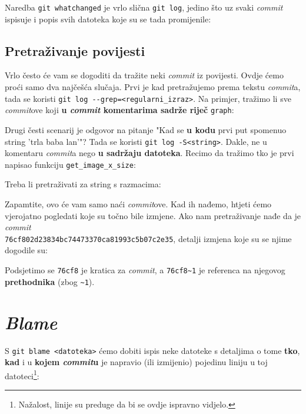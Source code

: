 Naredba \verb+git whatchanged+ je vrlo slična \verb+git log+, jedino što uz svaki \emph{commit} ispisuje i popis svih datoteka koje su se tada promijenile:



\subsection*{Pretraživanje povijesti}

Vrlo često će vam se dogoditi da tražite neki \emph{commit} iz povijesti.
Ovdje ćemo proći samo dva najčešća slučaja.
Prvi je kad pretražujemo prema tekstu \emph{commit}a, tada se koristi \verb+git log --grep=<regularni_izraz>+.
Na primjer, tražimo li sve \emph{commit}ove koji \textbf{u \emph{commit} komentarima sadrže riječ} \verb+graph+:


Drugi česti scenarij je odgovor na pitanje "Kad se \textbf{u kodu} prvi put spomenuo string 'trla baba lan'"? Tada se koristi \verb+git log -S<string>+.
Dakle, ne u komentaru \emph{commit}a nego \textbf{u sadržaju datoteka}.
Recimo da tražimo tko je prvi napisao funkciju \verb+get_image_x_size+:


Treba li pretraživati za string s razmacima:


Zapamtite, ovo će vam samo naći \emph{commit}ove.
Kad ih nađemo, htjeti ćemo vjerojatno pogledati koje su točno bile izmjene.
Ako nam pretraživanje nađe da je \emph{commit} \\ \verb+76cf802d23834bc74473370ca81993c5b07c2e35+, detalji izmjena koje su se njime dogodile su:


Podsjetimo se \verb+76cf8+ je kratica za \emph{commit}, a \verb+76cf8~1+ je referenca na njegovog \textbf{prethodnika} (zbog \verb+~1+).

\section*{\emph{Blame}}

S \verb+git blame <datoteka>+ ćemo dobiti ispis neke datoteke s detaljima o tome \textbf{tko}, \textbf{kad} i u \textbf{kojem \emph{commit}u} je napravio (ili izmijenio) pojedinu liniju u toj datoteci\footnote{Nažalost, linije su preduge da bi se ovdje ispravno vidjelo.}:

